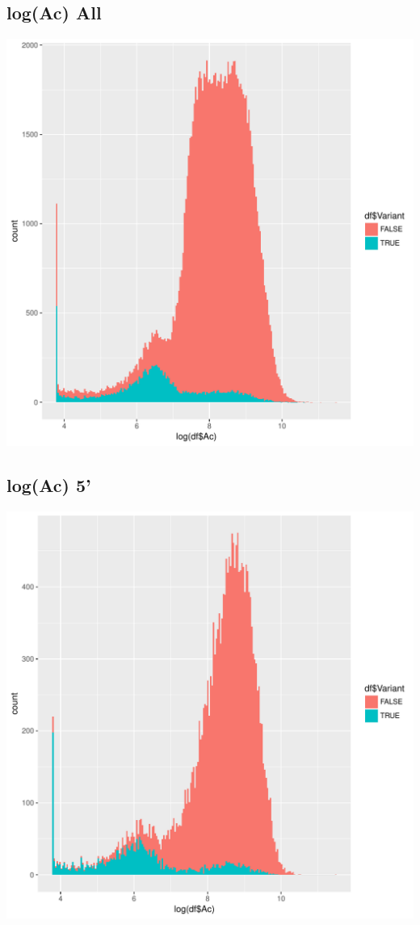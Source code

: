 \documentclass{article}\usepackage[]{graphicx}\usepackage[]{color}
\newenvironment{knitrout}{}{} %
\begin{document}
\subsection{log(Ac) All}
\begin{knitrout}
\color{fgcolor}
\includegraphics[width=1\linewidth]{figure/dens_all-1} 

\end{knitrout}
\clearpage
\subsection{log(Ac) 5'}
\begin{knitrout}
\color{fgcolor}
\includegraphics[width=1\linewidth]{figure/dens_5-1} 

\end{knitrout}
\clearpage
\end{document}
